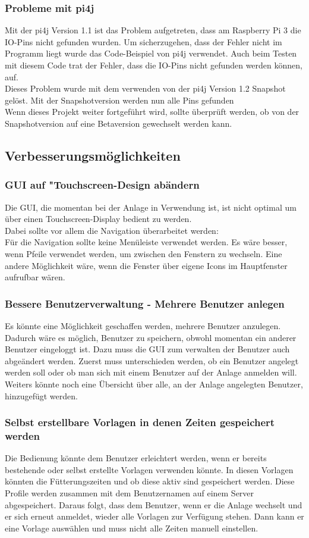 \subsubsection{Probleme mit pi4j}
Mit der pi4j Version 1.1 ist das Problem aufgetreten, dass am Raspberry Pi 3 die IO-Pins nicht gefunden wurden. Um sicherzugehen, dass der Fehler nicht im Programm liegt wurde das Code-Beispiel von pi4j verwendet. Auch beim Testen mit diesem Code trat der Fehler, dass die IO-Pins nicht gefunden werden können, auf.
\\ Dieses Problem wurde mit dem verwenden von der pi4j Version 1.2 Snapshot gelöst. Mit der Snapshotversion werden nun alle Pins gefunden
\\ Wenn dieses Projekt weiter fortgeführt wird, sollte überprüft werden, ob von der Snapshotversion auf eine Betaversion gewechselt werden kann.

\subsection{Verbesserungsmöglichkeiten}
\subsubsection{GUI auf "Touchscreen-Design\grqq{} abändern}
Die GUI, die momentan bei der Anlage in Verwendung ist, ist nicht optimal um über einen Touchscreen-Display bedient zu werden.
\\ Dabei sollte vor allem die Navigation überarbeitet werden: 
\\Für die Navigation sollte keine Menüleiste verwendet werden. Es wäre besser, wenn Pfeile verwendet werden, um zwischen den Fenstern zu wechseln. Eine andere Möglichkeit wäre, wenn die Fenster über eigene Icons im Hauptfenster aufrufbar wären.
\subsubsection{Bessere Benutzerverwaltung - Mehrere Benutzer anlegen}
Es könnte eine Möglichkeit geschaffen werden, mehrere Benutzer anzulegen. Dadurch wäre es möglich, Benutzer zu speichern, obwohl momentan ein anderer Benutzer eingeloggt ist. Dazu muss die GUI zum verwalten der Benutzer auch abgeändert werden. Zuerst muss unterschieden werden, ob ein Benutzer angelegt werden soll oder ob man sich mit einem Benutzer auf der Anlage anmelden will. Weiters könnte noch eine Übersicht über alle, an der Anlage angelegten Benutzer, hinzugefügt werden.
\subsubsection{Selbst erstellbare Vorlagen in denen Zeiten gespeichert werden}
Die Bedienung könnte dem Benutzer erleichtert werden, wenn er bereits bestehende oder selbst erstellte Vorlagen verwenden könnte. In diesen Vorlagen könnten die Fütterungszeiten und ob diese aktiv sind gespeichert werden. Diese Profile werden zusammen mit dem Benutzernamen auf einem Server abgespeichert. Daraus folgt, dass dem Benutzer, wenn er die Anlage wechselt und er sich erneut anmeldet, wieder alle Vorlagen zur Verfügung stehen. Dann kann er eine Vorlage auswählen und muss nicht alle Zeiten manuell einstellen.

